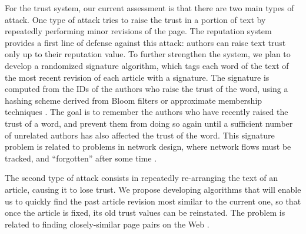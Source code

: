 For the trust system, our current assessment is that there are two
main types of attack.
One type of attack tries to raise the trust in a portion of text by
repeatedly performing minor revisions of the page.
The reputation system provides a first line of defense against this
attack: authors can raise text trust only up to their reputation
value.
To further strengthen the system, we plan to develop a randomized
signature algorithm, which tags each word of the text of the most
recent revision of each article with a signature.
The signature is computed from the IDs of the authors who raise the
trust of the word, using a hashing scheme derived from Bloom filters
\cite{Bloom70,Mitzenmacher02}
or approximate membership techniques \cite{ApproxMemb06}.
The goal is to remember the authors who have recently raised the trust
of a word, and prevent them from doing so again until a sufficient
number of unrelated authors has also affected the trust of the word.
This signature problem is related to problems in network design, where
network flows must be tracked, and ``forgotten'' after some time
\cite{BroderMitzen04,ApproxMemb06}.

The second type of attack consists in repeatedly re-arranging the text
of an article, causing it to lose trust.
We propose developing algorithms that will enable us to quickly find the
past article revision most similar to the current one, so that once
the article is fixed, its old trust values can be reinstated.
The problem is related to finding closely-similar page pairs on the Web
\cite{Gusfield97,Lopresti99,Bilenko03}.

